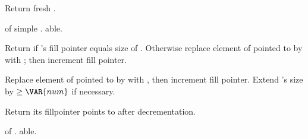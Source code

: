 \begin{LIST}{1cm}
  
  {
    Return fresh .
  }

  {
     of simple . able.
  }

  {
  Return \retval{\NIL} if 's fill pointer equals size of
  . Otherwise replace element of  pointed to
  by  with ; then increment fill
  pointer. 
  }

  {
  Replace element of  pointed to by  with
  , then increment fill pointer. Extend 's size by
  $\ge \VAR{num}$ if necessary.
  }

  {
  Return  its fillpointer points to
  after decrementation.
  }

  {
   of . able.
  }

\end{LIST}



